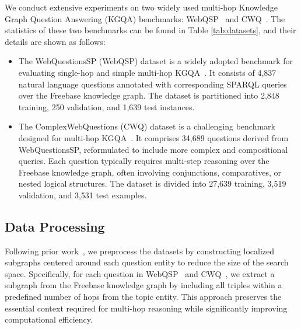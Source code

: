 We conduct extensive experiments on two widely used multi-hop Knowledge Graph Question Answering (KGQA) benchmarks: WebQSP~\cite{talmor2018web} and CWQ~\cite{yih2016value}. The statistics of these two benchmarks can be found in Table \ref{tab:datasets}, and
their details are shown as follows:

\begin{itemize}
    \item The WebQuestionsSP (WebQSP) dataset is a widely adopted benchmark for evaluating single-hop and simple multi-hop KGQA~\cite{yih2016value}. It consists of 4,837 natural language questions annotated with corresponding SPARQL queries over the Freebase knowledge graph. The dataset is partitioned into 2,848 training, 250 validation, and 1,639 test instances.
    \item The ComplexWebQuestions (CWQ) dataset is a challenging benchmark designed for multi-hop KGQA~\cite{talmor2018web}. It comprises 34,689 questions derived from WebQuestionsSP, reformulated to include more complex and compositional queries. Each question typically requires multi-step reasoning over the Freebase knowledge graph, often involving conjunctions, comparatives, or nested logical structures. The dataset is divided into 27,639 training, 3,519 validation, and 3,531 test examples.

\end{itemize}

\subsection{Data Processing}

Following prior work~\cite{shen2025reasoning,long2025enhancing, ma2025deliberation}, we preprocess the datasets by constructing localized subgraphs centered around each question entity to reduce the size of the search space. Specifically, for each question in WebQSP~\cite{yih2016value} and CWQ~\cite{talmor2018web}, we extract a subgraph from the Freebase knowledge graph by including all triples within a predefined number of hops from the topic entity. This approach preserves the essential context required for multi-hop reasoning while significantly improving computational efficiency. 

